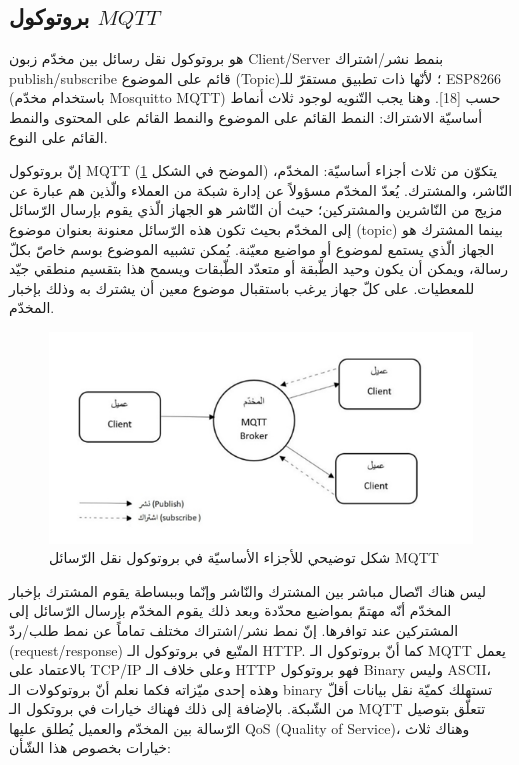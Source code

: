\subsection{بروتوكول $ MQTT $}

هو بروتوكول نقل رسائل بين مخدّم زبون Client/Server بنمط نشر/اشتراك publish/subscribe قائم على الموضوع (Topic)؛ لأنّها ذات تطبيق مستقرّ للـ ESP8266  (باستخدام مخدّم Mosquitto MQTT) حسب [18]. وهنا يجب التّنويه لوجود ثلاث أنماط أساسيّة الاشتراك: النمط القائم على الموضوع والنمط القائم على المحتوى والنمط القائم على النوع.

إنّ بروتوكول MQTT (الموضح في الشكل \ref{fig:fig163}) يتكوّن من ثلاث أجزاء أساسيّة: المخدّم، النّاشر، والمشترك. يُعدّ المخدّم مسؤولاً عن إدارة شبكة من العملاء والّذين هم عبارة عن مزيج من النّاشرين والمشتركين؛ حيث أن النّاشر هو الجهاز الّذي يقوم بإرسال الرّسائل إلى المخدّم بحيث تكون هذه الرّسائل معنونة بعنوان موضوع (topic) بينما المشترك هو الجهاز الّذي يستمع لموضوع أو مواضيع معيّنة. يُمكن تشبيه الموضوع بوسم خاصّ بكلّ رسالة، ويمكن أن يكون وحيد الطّبقة أو متعدّد الطّبقات ويسمح هذا بتقسيم منطقي جيّد للمعطيات. على كلّ جهاز يرغب باستقبال موضوع معين أن يشترك به وذلك بإخبار المخدّم.
\begin{figure}
	\centering
	\includegraphics[width=0.7\linewidth]{figs/16/fig16_3}
	\caption{شكل توضيحي للأجزاء الأساسيّة في بروتوكول نقل الرّسائل MQTT}
	\label{fig:fig163}
\end{figure}

ليس هناك اتّصال مباشر بين المشترك والنّاشر وإنّما وببساطة يقوم المشترك بإخبار المخدّم أنّه مهتمّ بمواضيع محدّدة وبعد ذلك يقوم المخدّم بإرسال الرّسائل إلى المشتركين عند توافرها. إنّ نمط نشر/اشتراك مختلف تماماً عن نمط طلب/ردّ (request/response) المتّبع في بروتوكول الـ HTTP. كما أنّ بروتوكول الـ MQTT يعمل بالاعتماد على TCP/IP وعلى خلاف الـ HTTP فهو بروتوكول Binary وليس ASCII، وهذه إحدى ميّزاته فكما نعلم أنّ بروتوكولات الـ binary تستهلك كميّة نقل بيانات أقلّ من الشّبكة. بالإضافة إلى ذلك فهناك خيارات في بروتكول الـ MQTT تتعلّق بتوصيل الرّسالة بين المخدّم والعميل يُطلق عليها QoS (Quality of Service)، وهناك ثلاث خيارات بخصوص هذا الشّأن:

